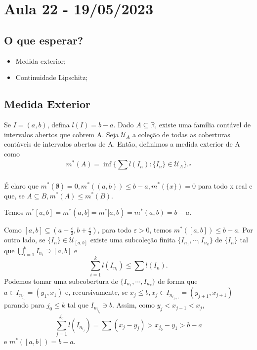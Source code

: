 \documentclass[analysis_notes.tex]{subfiles}
\begin{document}
\section{Aula 22 - 19/05/2023}
\subsection{O que esperar?}
\begin{itemize}
	\item Medida exterior;
	\item Continuidade Lipschitz;
\end{itemize}
\subsection{Medida Exterior}
\begin{def*}
	Se \(I=(a, b)\), defina \(l(I) = b-a.\) Dado \(A\subseteq{\mathbb{R}}\), existe
	uma família contável de intervalos abertos que cobrem A. Seja \(\mathcal{U}_{A}\)
	a cole\c cão de todas as coberturas contáveis de intervalos abertos de A. Então,
	definimos a medida exterior de A como
	\[
		m^{*}(A) = \inf\{\sum\limits_{}^{}l(I_{n}):\{I_{n}\}\in \mathcal{U}_{A}\}.\square
	\]
\end{def*}
É claro que \(m^{*}(\emptyset) = 0, m^{*}((a, b))\leq b-a, m^{*}(\{x\}) = 0\) para todo
x real e que, se \(A\subseteq{B}, m^{*}(A)\leq m^{*}(B).\)
\begin{lemma*}
	Temos \(m^{*}[a, b]=m^{*}(a, b]=m^{*}[a, b)=m^{*}(a, b) = b-a.\)
\end{lemma*}
\begin{proof*}
	Como \([a, b]\subseteq{(a-\frac{\varepsilon }{2}, b+\frac{\varepsilon }{2})}\), para todo \(\varepsilon >0\), temos
	\(m^{*}([a, b])\leq b-a.\) Por outro lado, se \(\{I_{n}\}\in \mathcal{U}_{[a, b]}\) existe
	uma subcole\c cão finita \(\{I_{n_{1}}, \cdots, I_{n_{k}}\}\) de \(\{I_{n}\}\) tal que
	\(\bigcup_{i=1}^{k}{I_{n_{i}}}\supseteq{[a, b]}\) e
	\[
		\sum\limits_{i=1}^{k}l(I_{n_{i}})\leq \sum\limits_{}^{}l(I_{n}).
	\]
	Podemos tomar uma subcobertura de \(\{I_{n_{1}}, \cdots, I_{n_{k}}\}\) de forma que
	\(a\in I_{n_{j_{1}}} = (y_{1}, x_{1})\) e, recursivamente, se \(x_{j}\leq b, x_{j}\in I_{n_{i_{j+1}}} = (y_{j+1},x_{j+1})\)
	parando para \(j_{0}\leq k\) tal que \(I_{n_{i_{j_{0}}}}\ni b\). Assim, como
	\(y_{j} < x_{j-1} < x_{j},\)
	\[
		\sum\limits_{j=1}^{j_{0}}l(I_{n_{i_{j}}}) = \sum\limits_{}^{}(x_{j} - y_{j}) > x_{j_{0}} - y_{1} > b - a
	\]
	e \(m^{*}([a, b]) = b-a.\) \qedsymbol
\end{proof*}
\end{document}
